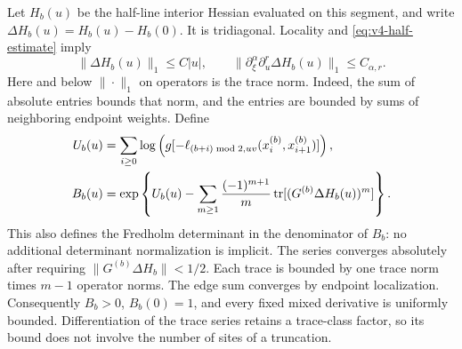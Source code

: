 Let $H_b(u)$ be the half-line interior Hessian evaluated on this
segment, and write $\Delta H_b(u)=H_b(u)-H_b(0)$. It is tridiagonal.
Locality and \eqref{eq:v4-half-estimate} imply
\begin{equation}\label{eq:v4-half-trace}
 \|\Delta H_b(u)\|_1\le C|u|,
 \qquad
 \|\partial_\xi^\alpha\partial_u^r\Delta H_b(u)\|_1
                      \le C_{\alpha,r}.
\end{equation}
Here and below $\|\cdot\|_1$ on operators is the trace norm. Indeed,
the sum of absolute entries bounds that norm, and the entries are
bounded by sums of neighboring endpoint weights. Define
\begin{align}
 U_b(u)&=\sum_{i\ge0}\log\left(
 g[-\ell_{(b+i)\bmod2,uv}(x_i^{(b)},x_{i+1}^{(b)})]\right),
 \label{eq:v4-half-product}\\
 B_b(u)&=\exp\left\{U_b(u)
 -\sum_{m\ge1}\frac{(-1)^{m+1}}m
       \operatorname{tr}[(G^{(b)}\Delta H_b(u))^m]\right\}.
 \label{eq:v4-half-amplitude}
\end{align}
This also defines the Fredholm determinant in the denominator of
$B_b$: no additional determinant normalization is implicit. The series
converges absolutely after requiring
$\|G^{(b)}\Delta H_b\|<1/2$. Each trace is bounded by one trace
norm times $m-1$ operator norms. The edge sum converges by endpoint
localization. Consequently $B_b>0$, $B_b(0)=1$, and every fixed
mixed derivative is uniformly bounded. Differentiation of the trace
series retains a trace-class factor, so its bound does not involve the
number of sites of a truncation.

